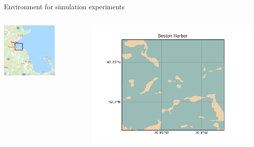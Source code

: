 \documentclass[9pt,xcolor=table]{beamer}
\begin{document}
\begin{frame}{Environment for simulation experiments}
    \begin{columns}
        \begin{column}{0.5\textwidth}
        \centering
            \includegraphics[width=0.65\textwidth,trim={0cm 0cm 0cm 0cm},clip]{img/large.png}
        \end{column}    
        \begin{column}{0.5\textwidth}
            \includegraphics[width=\textwidth,trim={0cm 0cm 0cm 0cm},clip]{img/full.png}
        \end{column}
    \end{columns}
    \begin{columns}
        \begin{column}{0.5\textwidth}

\end{column}
\end{columns}
\end{frame}
\end{document}
